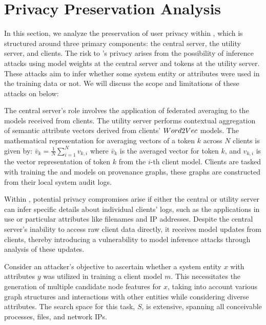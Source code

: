 \section{Privacy Preservation Analysis}
\label{sec:privacy}



In this section, we analyze the preservation of user privacy within \Sys, which is structured around three primary components: the central server, the utility server, and clients. The risk to \Sys's privacy arises from the possibility of inference attacks using model weights at the central server and \wordvec tokens at the utility server. These attacks aim to infer whether some system entity or attributes were used in the training data or not. We will discuss the scope and limitations of these attacks on \Sys below:

 The central server's role involves the application of federated averaging to the \gnnshort models received from clients. The utility server performs contextual aggregation of semantic attribute vectors derived from clients' \(Word2Vec\) models.  The mathematical representation for averaging vectors of a token \(k\) across \(N\) clients is given by: \( \bar{v}_k = \frac{1}{N} \sum_{i=1}^{N} v_{k,i} \) where \(\bar{v}_k\) is the averaged vector for token \(k\), and \(v_{k,i}\) is the vector representation of token \(k\) from the \(i\)-th client model. Clients are tasked with training the \wordvec and \gnnshort models on provenance graphs, these graphs are constructed from their local system audit logs.

 Within \Sys, potential privacy compromises arise if either the central or utility server can infer specific details about individual clients' logs, such as the applications in use or particular attributes like filenames and IP addresses. Despite the central server's inability to access raw client data directly, it receives model updates from clients, thereby introducing a vulnerability to model inference attacks through analysis of these updates.

Consider an attacker's objective to ascertain whether a system entity \(x\) with attributes \(y\) was utilized in training a client model \(m\). This necessitates the generation of multiple candidate node features for \(x\), taking into account various graph structures and interactions with other entities while considering diverse attributes. The search space for this task, \(S\), is extensive, spanning all conceivable processes, files, and network IPs.

